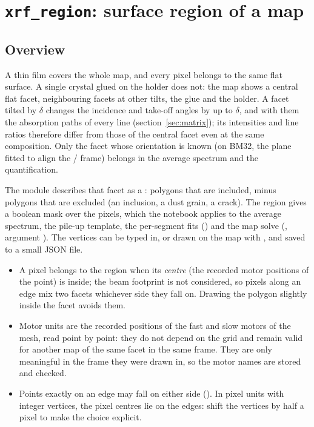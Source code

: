 \section{\texttt{xrf\_region}: surface region of a map}\label{sec:region}

\subsection{Overview}

A thin film covers the whole map, and every pixel belongs to the same flat surface. A single
crystal glued on the holder does not: the map shows a central flat facet, neighbouring facets
at other tilts, the glue and the holder. A facet tilted by $\delta$ changes the incidence and
take-off angles by up to $\delta$, and with them the absorption paths of every line
(section~\ref{sec:matrix}); its intensities and line ratios therefore differ from those of the
central facet even at the same composition. Only the facet whose orientation is known (on
BM32, the plane fitted to align the / frame) belongs in the average spectrum and
the quantification.

The module describes that facet as a : polygons that are included, minus
polygons that are excluded (an inclusion, a dust grain, a crack). The region gives a boolean
mask over the pixels, which the notebook applies to the average spectrum, the pile-up template,
the per-segment fits () and the map solve (, argument
). The vertices can be typed in, or drawn on the map with , and
saved to a small JSON file.

\begin{hyp}
\begin{itemize}[nosep,leftmargin=1em]
\item A pixel belongs to the region when its \emph{centre} (the recorded motor positions of
  the point) is inside; the beam footprint is not considered, so pixels along an edge mix two
  facets whichever side they fall on. Drawing the polygon slightly inside the facet avoids them.
\item Motor units are the recorded positions of the fast and slow motors of the mesh, read
  point by point: they do not depend on the grid and remain valid for another map of the same
  facet in the same frame. They are only meaningful in the frame they were drawn in, so the
  motor names are stored and checked.
\item Points exactly on an edge may fall on either side (). In pixel
  units with integer vertices, the pixel centres lie on the edges: shift the vertices by half
  a pixel to make the choice explicit.
\end{itemize}
\end{hyp}

